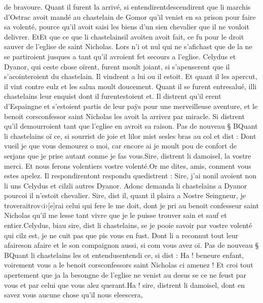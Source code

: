 \documentclass{article}
\begin{document}
\begin{pages}
         de bravoure. \pend
\pstart Quant il furent la arrivé, si 
   entendirentdescendirent que 
   li marchis d’Ostrac avoit mandé au 
   chastelain de Gomor 
   qu’il venist en sa prison pour faire sa volenté, pource qu’il avoit saisi les biens d’un 
   sien chevalier que il ne vouloit delivrer. 
   EtEt que ce que 
   li chastelainsil 
   avoiten avoit fait, ce 
   fu pour le droit sauver de l’eglise de 
      saint Nicholas. 
   Lors n’i ot nul qui ne s’afichast que de la ne se partiroient jusques a tant qu’il avroient fet secours a 
   l’eglise. 
   Celydus et Dyanor, qui ceste chose oïrent, furent moult joiant, 
   si s’apenserent que il s’acointeroient du chastelain. Il vindrent a lui ou il estoit. 
   Et quant il les apercut, il vint contre eulz et les salua moult doucement. 
   Quant il se furent entresalué, 
   illi chastelains leur enquist 
   dont il furentestoient et. 
   Il distrent qu’il erent 
      d’Espaingne et s’estoient partis de leur paÿs pour une merveilleuse aventure, 
      et le benoit corsconfessor 
      saint Nicholas les avoit la arrivez par miracle. 
   Si distrent qu’il demourroient tant que l’eglise 
      en avroit sa raison. \pend
\pstart Pas de nouveau § BQuant li chastelains 
   oï ce, si sourrist de joie et lilor mist 
   sesles bras au col et dist :
   Dont vueil je que vous demourez o moi, 
      car encore ai je moult pou de confort de serjans que je prise 
      autant conme je fas vous.Sire, distrent li damoisel, la vostre merci. Et nous ferons volentiers vostre volenté.Or me dites, amis, conment vous estes apelez.
   Il respondirentont respondu quedistrent :
   Sire, j’ai nonil avoient non li uns 
      Celydus et cilzli autres 
      Dyanor.
   Adonc demanda li chastelains a Dyanor pourcoi il n’estoit chevalier.
   Sire, dist il, quant il plaira a Nostre Seingneur, 
      je troveraitrov‹i›[e]rai 
      celui qui fere le me doit, dont je pri au benoit confesseur 
      saint Nicholas qu’il me lesse tant vivre que je le puisse trouver sain et sauf 
      et entier.Celydus, biau sire, dist li chastelains, 
   se je pooie savoir par vostre volenté qui cilz est, je ne cuit pas que pis vous en fust.
   Dont li a reconnut tout leur afaireson afaire
      et le son compaignon aussi, 
   si com vous avez oï. \pend
\pstart Pas de nouveau § BQuant li chastelains 
   les ot entendusentendi ce, si dist :
   Ha ! beneure enfant, voirement vous a le benoit 
      corsconfessors saint Nicholas 
      ci amenez ! 
   Et croi tout apertement que ja la besongne de l’eglise ne venist au desus 
   se ce ne feust par vous et par celui que vous alez querant.Ha ! sire, distrent li damoisel, dont en savez vous aucune chose qu’il nous eleescera, 

\end{pages}
\end{document}
